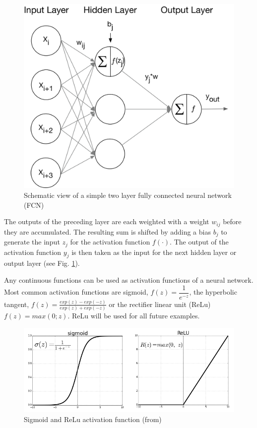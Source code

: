 \begin{figure}[H]
	\centering
	\includegraphics[width=1.0\linewidth]{bilder/grundlagen/fast-forward.png}
	\caption{Schematic view of a  simple two layer fully connected neural network (FCN)}
	\label{fig:FCN}
\end{figure}

The outputs of the preceding layer are each weighted with a weight \(w_{ij}\) before they are accumulated.
The resulting sum is shifted by adding a bias \(b_{j}\) to generate the input \(z_{j}\) for the 
activation function \( f(\cdot) \).
The output of the activation function \(y_{j}\) is then taken as the input for the next 
hidden layer or output layer (see Fig. \ref{fig:FCN}).
 
 Any continuous functions can be used as activation functions of a neural network. 
 Most common activation functions are sigmoid,  \(f(z) = \dfrac{1}{e^{-z}}\), 
 the hyperbolic tangent, \(f(z) = \frac{exp(z)-exp(-z)}{exp(z)+exp(-z)}\) or the 
 rectifier linear unit (ReLu) \(f(z) = max(0; z)\). ReLu will be used for all future examples.


\begin{figure}[H]
	\centering
	\includegraphics[width=0.8\linewidth]{bilder/grundlagen/sigmoid.png}
	\caption{Sigmoid and ReLu activation function (from\cite{Sigmoid})}
	\label{fig:Sigmoid}
\end{figure}


